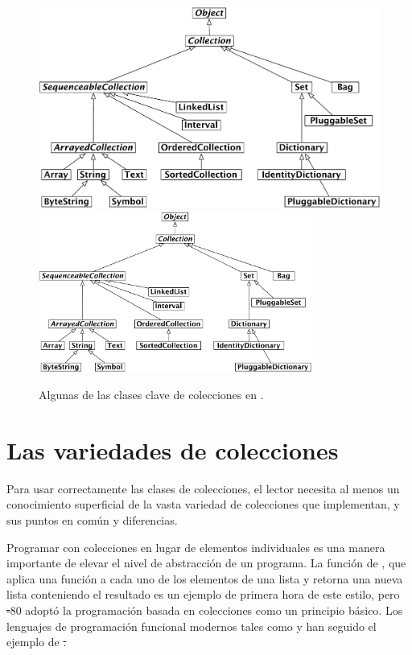 \documentclass[a4paper,10pt,twoside]{book}
\begin{document}
\begin{figure}
\begin{center}
\ifluluelse
	{\includegraphics[width=\textwidth]{CollectionHierarchy}}
	{\includegraphics[width=0.8\textwidth]{CollectionHierarchy}}
\caption{Algunas de las clases clave de colecciones en \pharo.}
\end{center}
\end{figure}

\section{Las variedades de colecciones}

Para usar correctamente las clases de colecciones, el lector necesita al menos un conocimiento superficial de la vasta variedad de colecciones que implementan, y sus puntos en com\'un y diferencias.

Programar con colecciones en lugar de elementos individuales es una manera importante de elevar el nivel de abstracci\'on de un programa. 
La funci\'on  de , que aplica una funci\'on a cada uno de los elementos de una lista y retorna una nueva lista conteniendo el resultado es un ejemplo de primera hora de este estilo, pero \st-80 adopt\'o la programaci\'on basada en colecciones como un principio b\'asico. Los lenguajes de programaci\'on funcional modernos tales como  y  han seguido el ejemplo de \st.
\end{document}
